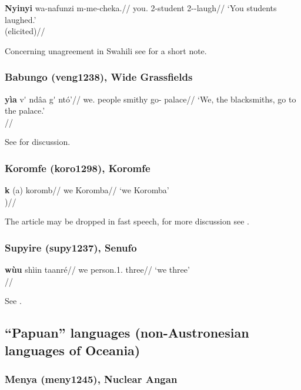 \ex 
\begingl
\gla \textbf{Nyinyi} wa-nafunzi m-me-cheka.//
\glb you.\Pl{} \Ncl{}2-student 2\Pl{}-\Pst-laugh//
\glft `You students laughed.'\\(elicited)//
\endgl
\xe

Concerning unagreement \citep{hurtado1985, ackemaneeleman2012unagr} in Swahili see \citet[546]{hoehn2015unagr} for a short note.

\subsubsection{Babungo (veng1238), Wide Grassfields}

\ex
\begingl
\gla  \textbf{yìa} v\'{\textbari}\textbari{} ndâa g\'{\textschwa} ntó'//
\glb we.\Excl{} people smithy go-\Prs{} palace//
\glft `We, the blacksmiths, go to the palace.'\\\citep[197, (134a)]{schaub1985}//
\endgl
\xe

See \citet[197f.]{schaub1985} for discussion.

\subsubsection{Koromfe (koro1298), Koromfe}

\ex 
\begingl
\gla \textbf{\textupsilon{}k\textopeno{}} (a) koromb\textturnv{}//
\glb we \Art{} Koromba//
\glft `we Koromba'\\\citep[251, (585)]{rennison1997})//
\endgl
\xe 

The article may be dropped in fast speech, for more discussion see  \citet[242, 250f.]{rennison1997}.

\subsubsection{Supyire (supy1237), Senufo}

\ex \begingl
\gla \textbf{wùu} shìin taanré//
\glb we person.\Ncl{}1.\Pl{} three//
\glft `we three'\\\citep[after][208, (45a)]{carlson1994}//
\endgl
\xe

See \citealp[207f.]{carlson1994}.


\subsection{``Papuan'' languages (non-Austronesian languages of Oceania)}


\subsubsection{Menya (meny1245), Nuclear Angan}

